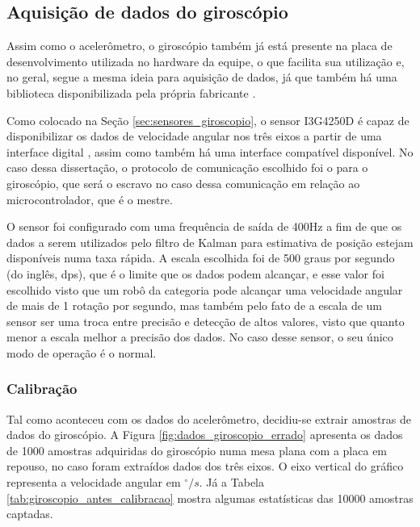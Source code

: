 \documentclass[acronym, symbols, table, deposito]{fei}
\begin{document}
	\subsection{Aquisição de dados do giroscópio}
	
	Assim como o acelerômetro, o giroscópio também já está presente na placa de desenvolvimento utilizada no hardware da equipe, o que facilita sua utilização e, no geral, segue a mesma ideia para aquisição de dados, já que também há uma biblioteca disponibilizada pela própria fabricante \cite{gyro_repository}.
	
	Como colocado na Seção \ref{sec:sensores_giroscopio}, o sensor I3G4250D é capaz de disponibilizar os dados de velocidade angular nos três eixos a partir de uma interface digital , assim como também há uma interface  compatível disponível. No caso dessa dissertação, o protocolo de comunicação escolhido foi o  para o giroscópio, que será o escravo no caso dessa comunicação em relação ao microcontrolador, que é o mestre.
	
	O sensor foi configurado com uma frequência de saída de 400Hz a fim de que os dados a serem utilizados pelo filtro de Kalman para estimativa de posição estejam disponíveis numa taxa rápida. A escala escolhida foi de 500 graus por segundo (do inglês, dps), que é o limite que os dados podem alcançar, e esse valor foi escolhido visto que um robô da categoria  pode alcançar uma velocidade angular de mais de 1 rotação por segundo, mas também pelo fato de a escala de um sensor ser uma troca entre precisão e detecção de altos valores, visto que quanto menor a escala melhor a precisão dos dados. No caso desse sensor, o seu único modo de operação é o normal.
	
	\subsubsection{Calibração}
	
	Tal como aconteceu com os dados do acelerômetro, decidiu-se extrair amostras de dados do giroscópio. A Figura \ref{fig:dados_giroscopio_errado} apresenta os dados de 1000 amostras adquiridas do giroscópio numa mesa plana com a placa em repouso, no caso foram extraídos dados dos três eixos. O eixo vertical do gráfico representa a velocidade angular em $^\circ/s$. Já a Tabela \ref{tab:giroscopio_antes_calibracao} mostra algumas estatísticas das 10000 amostras captadas.
	
\end{document}
